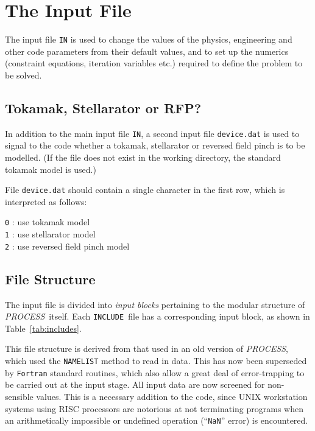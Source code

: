 \documentclass[11pt,a4paper]{report}
\newcommand{\PS}{\mbox{\it PROCESS\/ }}
\newcommand{\PSC}{\mbox{\it PROCESS},\/ }
\newcommand{\INCLUDE}{\mbox{\tt INCLUDE }}
\begin{document}
\section{The Input File}
\label{sec:infile}

The input file \texttt{IN} is used to change the values of the physics,
engineering and other code parameters from their default values, and to set up
the numerics (constraint equations, iteration variables etc.) required to
define the problem to be solved.

\subsection{Tokamak, Stellarator or RFP?}

In addition to the main input file \texttt{IN}, a second input file
\texttt{device.dat} is used to signal to the code whether a tokamak,
stellarator or reversed field pinch is to be modelled. (If the file does not
exist in the working directory, the standard tokamak model is used.)

File \texttt{device.dat} should contain a single character in the first
row, which is interpreted as follows:
\begin{tabbing}
\hspace{15mm}\= \texttt{0} : use tokamak model \\
\> \texttt{1} : use stellarator model \\
\> \texttt{2} : use reversed field pinch model
\end{tabbing}

\subsection{File Structure}

The input file is divided into {\it input blocks}\/ pertaining to the modular
structure of \PS itself. Each \INCLUDE file has a corresponding input block,
as shown in Table~\ref{tab:includes}.

This file structure is derived from that used in an old version of \PSC which
used the {\tt NAMELIST} method to read in data. This has now been superseded
by \texttt{Fortran} standard routines, which also allow a great deal of
error-trapping to be carried out at the input stage.  All input data are now
screened for non-sensible values. This is a necessary addition to the code,
since UNIX workstation systems using RISC processors are notorious at not
terminating programs when an arithmetically impossible or undefined operation
(``{\tt NaN}'' error) is encountered.
\end{document}
